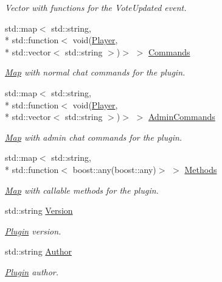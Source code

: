 \begin{DoxyCompactItemize}
\begin{DoxyCompactList}\small\item\em Vector with functions for the Vote\-Updated event. \end{DoxyCompactList}\item 
std\-::map$<$ std\-::string, \\*
std\-::function$<$ void(\hyperlink{structPlayer}{Player}, \\*
std\-::vector$<$ std\-::string $>$)$>$ $>$ \hyperlink{classPlugin_a588dcd49b4fe45b3a401b749795b95fe}{Commands}
\begin{DoxyCompactList}\small\item\em \hyperlink{structMap}{Map} with normal chat commands for the plugin. \end{DoxyCompactList}\item 
std\-::map$<$ std\-::string, \\*
std\-::function$<$ void(\hyperlink{structPlayer}{Player}, \\*
std\-::vector$<$ std\-::string $>$)$>$ $>$ \hyperlink{classPlugin_a7a1ba3ed5e3c0c23eb1ea2e33cc61c1a}{Admin\-Commands}
\begin{DoxyCompactList}\small\item\em \hyperlink{structMap}{Map} with admin chat commands for the plugin. \end{DoxyCompactList}\item 
std\-::map$<$ std\-::string, \\*
std\-::function$<$ boost\-::any(boost\-::any)$>$ $>$ \hyperlink{classPlugin_a4a8030e2fa113265d123aa6178c64318}{Methods}
\begin{DoxyCompactList}\small\item\em \hyperlink{structMap}{Map} with callable methods for the plugin. \end{DoxyCompactList}\item 
\hypertarget{classPlugin_a8e332303a494988d2444589ac21c3414}{std\-::string \hyperlink{classPlugin_a8e332303a494988d2444589ac21c3414}{Version}}\label{classPlugin_a8e332303a494988d2444589ac21c3414}

\begin{DoxyCompactList}\small\item\em \hyperlink{classPlugin}{Plugin} version. \end{DoxyCompactList}\item 
\hypertarget{classPlugin_a2b51c785a131a581164f2c82e83cb660}{std\-::string \hyperlink{classPlugin_a2b51c785a131a581164f2c82e83cb660}{Author}}\label{classPlugin_a2b51c785a131a581164f2c82e83cb660}

\begin{DoxyCompactList}\small\item\em \hyperlink{classPlugin}{Plugin} author. \end{DoxyCompactList}\end{DoxyCompactItemize}
